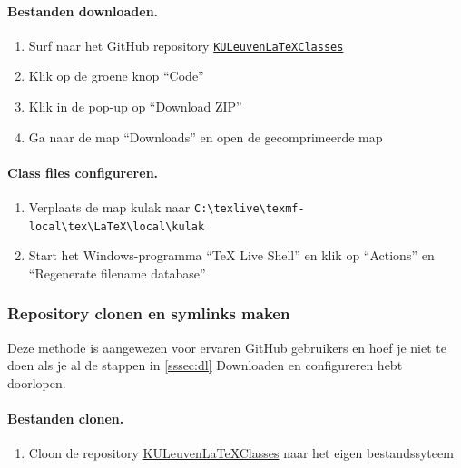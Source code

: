 \documentclass[kulak]{kulakarticle} %
\begin{document}
\paragraph{Bestanden downloaden.}
\begin{enumerate}
	\item Surf naar het GitHub repository
	      \href{https://github.com/srebry/KULeuvenLaTeXClasses}{\texttt{KULeuvenLaTeXClasses}}
	\item Klik op de groene knop ``Code''
	\item Klik in de pop-up op ``Download ZIP''
	\item Ga naar de map ``Downloads'' en open de gecomprimeerde map
\end{enumerate}
\paragraph{Class files configureren.}
\begin{enumerate}[resume]
	\item Verplaats de map kulak naar \verb+C:\texlive\texmf-local\tex\LaTeX\local\kulak+
	\item Start het Windows-programma ``TeX Live Shell'' en klik op ``Actions'' en ``Regenerate filename database''
\end{enumerate}

\subsubsection{Repository clonen en symlinks maken}
\label{sssec:gh}
Deze methode is aangewezen voor ervaren GitHub gebruikers en hoef je niet te doen als je al de stappen in \ref{sssec:dl} Downloaden en configureren hebt doorlopen.

\paragraph{Bestanden clonen.}

\begin{enumerate}
	\item Cloon de repository \href{https://github.com/srebry/KULeuvenLaTeXClasses}{KULeuvenLaTeXClasses} naar het eigen bestandssyteem
\end{enumerate}
\end{document}
